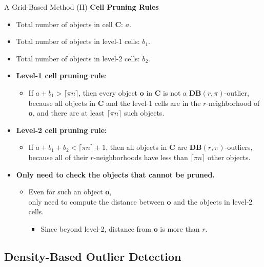\begin{frame}{A Grid-Based Method (II)}
	\textcolor{faugray}{\textbf{Cell Pruning Rules}}
	\begin{itemize}
		\item Total number of objects in cell $\mathbf{C}$: $a$.
		\item Total number of objects in level-1 cells: $b_1$.
		\item Total number of objects in level-2 cells: $b_2$.
	\end{itemize}
	\begin{itemize}
		\item \textbf{Level-1 cell pruning rule}:
		      \begin{itemize}
			      \item If $a + b_1 > \lceil \pi n \rceil$, then every object $\mathbf{o}$ in $\mathbf{C}$ is not a $\mathbf{DB}(r, \pi)$-outlier, because all objects in $\mathbf{C}$ and the level-1 cells are in the $r$-neighborhood of $\mathbf{o}$, and there are at least $\lceil \pi n \rceil$ such objects.
		      \end{itemize}
		\item \textbf{Level-2 cell pruning rule:}
		      \begin{itemize}
			      \item If $a + b_1 + b_2 < \lceil \pi n \rceil + 1$, then all objects in $\mathbf{C}$ are $\mathbf{DB}(r, \pi)$-outliers, because all of their $r$-neighborhoods have less than $\lceil \pi n \rceil$ other objects.
		      \end{itemize}
		\item \textbf{Only need to check the objects that cannot be pruned.}
		      \begin{itemize}
			      \item Even for such an object $\mathbf{o}$, \\
			            only need to compute the distance between $\mathbf{o}$ and the objects in level-2 cells.
			            \begin{itemize}
				            \item Since beyond level-2, distance from $\mathbf{o}$ is more than $r$.
			            \end{itemize}
		      \end{itemize}
	\end{itemize}
\end{frame}

\subsection{Density-Based Outlier Detection}

